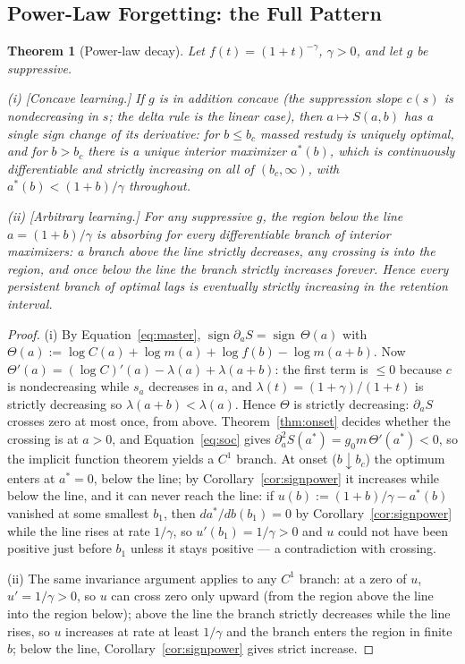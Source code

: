 \documentclass[man, 12pt, floatsintext]{apa6}
\newtheorem{theorem}{Theorem}
\theoremstyle{definition}
\theoremstyle{remark}
\begin{document}
\subsection{Power-Law Forgetting: the Full Pattern}

\begin{theorem}[Power-law decay]\label{thm:power}
Let $f(t) = (1+t)^{-\gamma}$, $\gamma>0$, and let $g$ be suppressive.

(i) [\emph{Concave learning.}] If $g$ is in addition concave (the suppression slope $c(s)$ is nondecreasing in $s$; the delta rule is the linear case), then $a \mapsto S(a,b)$ has a single sign change of its derivative: for $b \leq b_c$ massed restudy is uniquely optimal, and for $b > b_c$ there is a unique interior maximizer $a^*(b)$, which is continuously differentiable and \emph{strictly increasing on all of} $(b_c, \infty)$, with $a^*(b) < (1+b)/\gamma$ throughout.

(ii) [\emph{Arbitrary learning.}] For any suppressive $g$, the region below the line $a=(1+b)/\gamma$ is absorbing for every differentiable branch of interior maximizers: a branch above the line strictly decreases, any crossing is into the region, and once below the line the branch strictly increases forever. Hence every persistent branch of optimal lags is eventually strictly increasing in the retention interval.
\end{theorem}

\begin{proof}
(i) By Equation~\ref{eq:master}, $\operatorname{sign} \partial_a S = \operatorname{sign}\,\Theta(a)$ with $\Theta(a) := \log C(a) + \log m(a) + \log f(b) - \log m(a+b)$. Now $\Theta'(a) = (\log C)'(a) - \lambda(a) + \lambda(a+b)$: the first term is $\leq 0$ because $c$ is nondecreasing while $s_a$ decreases in $a$, and $\lambda(t) = (1+\gamma)/(1+t)$ is strictly decreasing so $\lambda(a+b) < \lambda(a)$. Hence $\Theta$ is strictly decreasing: $\partial_a S$ crosses zero at most once, from above. Theorem~\ref{thm:onset} decides whether the crossing is at $a>0$, and Equation~\ref{eq:soc} gives $\partial^2_a S(a^*) = g_0 m\,\Theta'(a^*) < 0$, so the implicit function theorem yields a $C^1$ branch. At onset ($b \downarrow b_c$) the optimum enters at $a^* = 0$, below the line; by Corollary~\ref{cor:signpower} it increases while below the line, and it can never reach the line: if $u(b) := (1+b)/\gamma - a^*(b)$ vanished at some smallest $b_1$, then $da^*/db(b_1) = 0$ by Corollary~\ref{cor:signpower} while the line rises at rate $1/\gamma$, so $u'(b_1) = 1/\gamma > 0$ and $u$ could not have been positive just before $b_1$ unless it stays positive --- a contradiction with crossing.

(ii) The same invariance argument applies to any $C^1$ branch: at a zero of $u$, $u' = 1/\gamma > 0$, so $u$ can cross zero only upward (from the region above the line into the region below); above the line the branch strictly decreases while the line rises, so $u$ increases at rate at least $1/\gamma$ and the branch enters the region in finite $b$; below the line, Corollary~\ref{cor:signpower} gives strict increase.
\end{proof}
\end{document}
